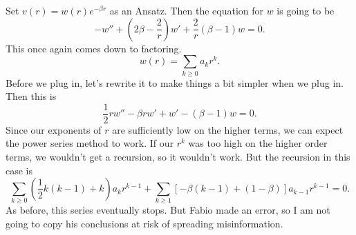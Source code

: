 Set \( v(r) = w(r) e^{- \beta r}  \) as an Ansatz. Then the equation for \( w \) is going to be
\[ - w'' + \left( 2 \beta - \frac{2}{r} \right)w' + \frac{2}{r} \left( \beta - 1 \right)w = 0. \]
This once again comes down to factoring.
\[ w(r) = \sum_{k \ge 0} a_{k} r^{k}. \]
Before we plug in, let's rewrite it to make things a bit simpler when we plug in. Then this is
\[ \frac{1}{2} r w'' - \beta r w' + w' - (\beta - 1)w = 0. \]
Since our exponents of \( r \) are sufficiently low on the higher terms, we can expect the power series method to work. If our \( r^{k} \) was too high on the higher order terms, we wouldn't get a recursion, so it wouldn't work. But the recursion in this case is
\[ \sum_{k \ge 0}\left( \frac{1}{2} k (k-1) + k \right)a_{k} r^{k-1} + \sum_{k \ge 1} \left[ - \beta(k-1) + (1 - \beta) \right] a_{k-1}r^{k-1} = 0. \]
As before, this series eventually stops. But Fabio made an error, so I am not going to copy his conclusions at risk of spreading misinformation.


